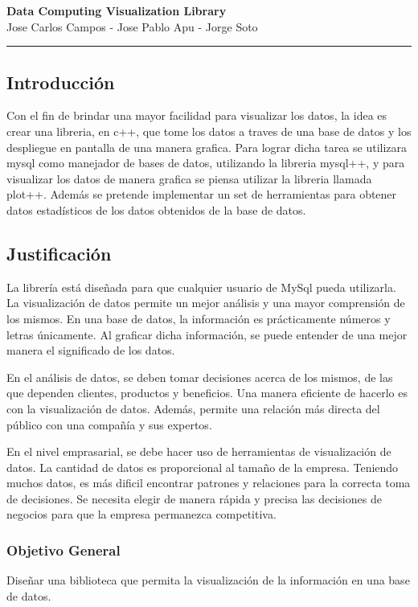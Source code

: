 \documentclass[11pt]{article}
\begin{document}
\begin{center}
{ \huge \bfseries Data Computing Visualization Library }\\[0.2cm]
{ Jose Carlos Campos - Jose Pablo Apu - Jorge Soto }\\[0.2cm]
\rule{\linewidth}{0.25mm}
\end{center}

\subsection*{Introducción}
Con el fin de brindar una mayor facilidad para visualizar los datos, la idea es crear una libreria, en c++, que tome los datos a traves de una base de datos y los despliegue en pantalla de una manera grafica. Para lograr dicha tarea se utilizara mysql como manejador de bases de datos, utilizando la libreria mysql++, y para visualizar los datos de manera grafica se piensa utilizar la libreria llamada plot++. Además se pretende implementar un set de herramientas para obtener datos estadísticos de los datos obtenidos de la base de datos. 

\subsection*{Justificación}
La librería está diseñada para que cualquier usuario de MySql pueda utilizarla. La visualización de datos permite un mejor análisis y una mayor comprensión de los mismos. En una base de datos, la información es prácticamente números y letras únicamente. Al graficar dicha información, se puede entender de una mejor manera el significado de los datos.

En el análisis de datos, se deben tomar decisiones acerca de los mismos, de las que dependen clientes, productos y beneficios. Una manera eficiente de hacerlo es con la visualización de datos. Además, permite una relación más directa del público con una compañía y sus expertos. %

En el nivel emprasarial, se debe hacer uso de herramientas de visualización de datos. La cantidad de datos es proporcional al tamaño de la empresa. Teniendo muchos datos, es más dificil encontrar patrones y relaciones para la correcta toma de decisiones. Se necesita elegir de manera rápida y precisa las decisiones de negocios para que la empresa permanezca competitiva. %

\subsubsection*{Objetivo General}
Diseñar una biblioteca que permita la visualización de la información en una base de datos.
\end{document}
